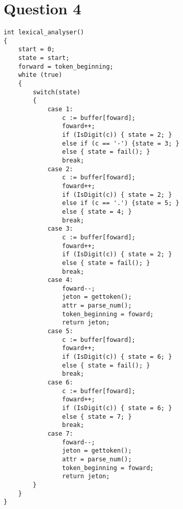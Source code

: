 \documentclass[class=article]{standalone}
\begin{document}
\section*{Question 4}

\begin{lstlisting}
int lexical_analyser()
{
    start = 0;
    state = start;
    forward = token_beginning;
    white (true)
    {
        switch(state)
        {
            case 1:
                c := buffer[foward];
                foward++;
                if (IsDigit(c)) { state = 2; } 
                else if (c == '-') {state = 3; } 
                else { state = fail(); }
                break;
            case 2:
                c := buffer[foward];
                foward++;
                if (IsDigit(c)) { state = 2; } 
                else if (c == '.') {state = 5; } 
                else { state = 4; }
                break;
            case 3:
                c := buffer[foward];
                foward++;
                if (IsDigit(c)) { state = 2; } 
                else { state = fail(); }
                break;
            case 4:
                foward--;
                jeton = gettoken();
                attr = parse_num();
                token_beginning = foward;
                return jeton;
            case 5:
                c := buffer[foward];
                foward++;
                if (IsDigit(c)) { state = 6; } 
                else { state = fail(); }
                break;
            case 6:
                c := buffer[foward];
                foward++;
                if (IsDigit(c)) { state = 6; } 
                else { state = 7; }
                break;
            case 7:
                foward--;
                jeton = gettoken();
                attr = parse_num();
                token_beginning = foward;
                return jeton;
        }
    }
}

\end{lstlisting}
\end{document}
